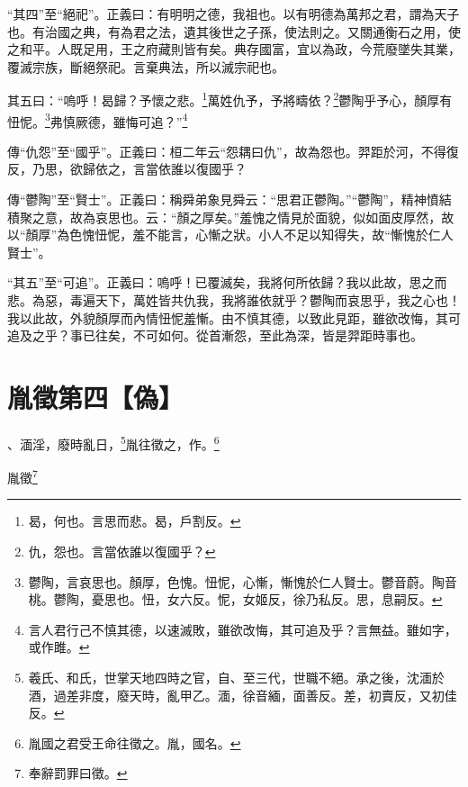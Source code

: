 {\noindent\shu{}\fzkt “其四”至“絕祀”。正義曰：有明明之德，我祖也。以有明德為萬邦之君，謂為天子也。有治國之典，有為君之法，遺其後世之子孫，使法則之。又關通衡石之用，使之和平。人既足用，王之府藏則皆有矣。典存國富，宜以為政，今荒廢墜失其業，覆滅宗族，斷絕祭祀。言棄典法，所以滅宗祀也。 \par}

其五曰：“嗚呼！曷歸？予懷之悲。\footnote{曷，何也。言思而悲。曷，戶割反。}萬姓仇予，予將疇依？\footnote{仇，怨也。言當依誰以復國乎？}鬱陶乎予心，顏厚有忸怩。\footnote{鬱陶，言哀思也。顏厚，色愧。忸怩，心慚，慚愧於仁人賢士。鬱音蔚。陶音桃。鬱陶，憂思也。忸，女六反。怩，女姬反，徐乃私反。思，息嗣反。}弗慎厥德，雖悔可追？”\footnote{言人君行己不慎其德，以速滅敗，雖欲改悔，其可追及乎？言無益。雖如字，或作雎。}


{\noindent\zhuan{}\fzbyks 傳“仇怨”至“國乎”。正義曰：桓二年云“怨耦曰仇”，故為怨也。羿距於河，不得復反，乃思，欲歸依之，言當依誰以復國乎？ \par}

{\noindent\zhuan{}\fzbyks 傳“鬱陶”至“賢士”。正義曰：稱舜弟象見舜云：“思君正鬱陶。”“鬱陶”，精神憤結積聚之意，故為哀思也。云：“顏之厚矣。”羞愧之情見於面貌，似如面皮厚然，故以“顏厚”為色愧忸怩，羞不能言，心慚之狀。小人不足以知得失，故“慚愧於仁人賢士”。 \par}

{\noindent\shu{}\fzkt “其五”至“可追”。正義曰：嗚呼！已覆滅矣，我將何所依歸？我以此故，思之而悲。為惡，毒遍天下，萬姓皆共仇我，我將誰依就乎？鬱陶而哀思乎，我之心也！我以此故，外貌顏厚而內情忸怩羞慚。由不慎其德，以致此見距，雖欲改悔，其可追及之乎？事已往矣，不可如何。從首漸怨，至此為深，皆是羿距時事也。 \par}

\section{胤徵第四【偽】}


、湎淫，廢時亂日，\footnote{羲氏、和氏，世掌天地四時之官，自、至三代，世職不絕。承之後，沈湎於酒，過差非度，廢天時，亂甲乙。湎，徐音緬，面善反。差，初賣反，又初佳反。}胤往徵之，作。\footnote{胤國之君受王命往徵之。胤，國名。}

胤徵\footnote{奉辭罰罪曰徵。}


